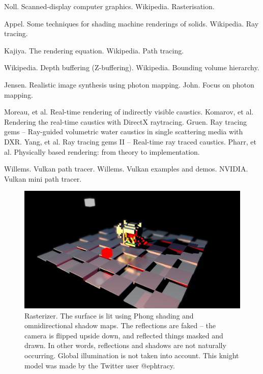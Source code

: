 \documentclass[12pt]{article}
\begin{document}
\begin{thebibliography}{9}

 Noll. Scanned-display computer graphics.
 Wikipedia. Rasterisation.

 Appel. Some techniques for shading machine renderings of solids.
 Wikipedia. Ray tracing.

 Kajiya. The rendering equation.
 Wikipedia. Path tracing.

 Wikipedia. Depth buffering (Z-buffering).
 Wikipedia. Bounding volume hierarchy.


 Jensen. Realistic image synthesis using photon mapping.
 John. Focus on photon mapping.


 Moreau, et al. Real-time rendering of indirectly visible caustics.
 Komarov, et al. Rendering the real-time caustics with DirectX raytracing.
 Gruen. Ray tracing gems -- Ray-guided volumetric water caustics in single scattering media with DXR.
 Yang, et al. Ray tracing gems II -- Real-time ray traced caustics.
 Pharr, et al. Physically based rendering: from theory to implementation.



 Willems. Vulkan path tracer.
 Willems. Vulkan examples and demos.
 NVIDIA. Vulkan mini path tracer.



\end{thebibliography}


\pagebreak







\begin{figure} 
\centering
  \includegraphics[width = 6 in]{fig1.png}
  \caption{ Rasterizer.
The surface is lit using Phong shading and omnidirectional shadow maps.
The reflections are faked -- the camera is flipped upside down, and reflected things masked and drawn.
In other words, reflections and shadows are not naturally occurring.
Global illumination is not taken into account.
This knight model was made by the Twitter user @ephtracy.
}

\end{figure}
\end{document}

